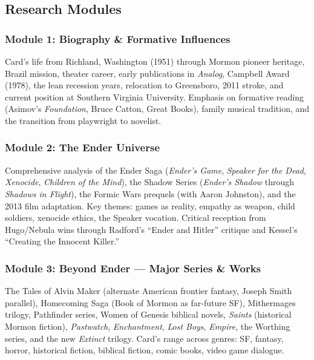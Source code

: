 \documentclass[11pt,letterpaper]{article}
\begin{document}
\subsection{Research Modules}

\subsubsection{Module 1: Biography \& Formative Influences}

Card's life from Richland, Washington (1951) through Mormon pioneer heritage, Brazil mission, theater career, early publications in \textit{Analog}, Campbell Award (1978), the lean recession years, relocation to Greensboro, 2011 stroke, and current position at Southern Virginia University. Emphasis on formative reading (Asimov's \textit{Foundation}, Bruce Catton, Great Books), family musical tradition, and the transition from playwright to novelist.

\subsubsection{Module 2: The Ender Universe}

Comprehensive analysis of the Ender Saga (\textit{Ender's Game}, \textit{Speaker for the Dead}, \textit{Xenocide}, \textit{Children of the Mind}), the Shadow Series (\textit{Ender's Shadow} through \textit{Shadows in Flight}), the Formic Wars prequels (with Aaron Johnston), and the 2013 film adaptation. Key themes: games as reality, empathy as weapon, child soldiers, xenocide ethics, the Speaker vocation. Critical reception from Hugo/Nebula wins through Radford's ``Ender and Hitler'' critique and Kessel's ``Creating the Innocent Killer.''

\subsubsection{Module 3: Beyond Ender --- Major Series \& Works}

The Tales of Alvin Maker (alternate American frontier fantasy, Joseph Smith parallel), Homecoming Saga (Book of Mormon as far-future SF), Mithermages trilogy, Pathfinder series, Women of Genesis biblical novels, \textit{Saints} (historical Mormon fiction), \textit{Pastwatch}, \textit{Enchantment}, \textit{Lost Boys}, \textit{Empire}, the Worthing series, and the new \textit{Extinct} trilogy. Card's range across genres: SF, fantasy, horror, historical fiction, biblical fiction, comic books, video game dialogue.
\end{document}
